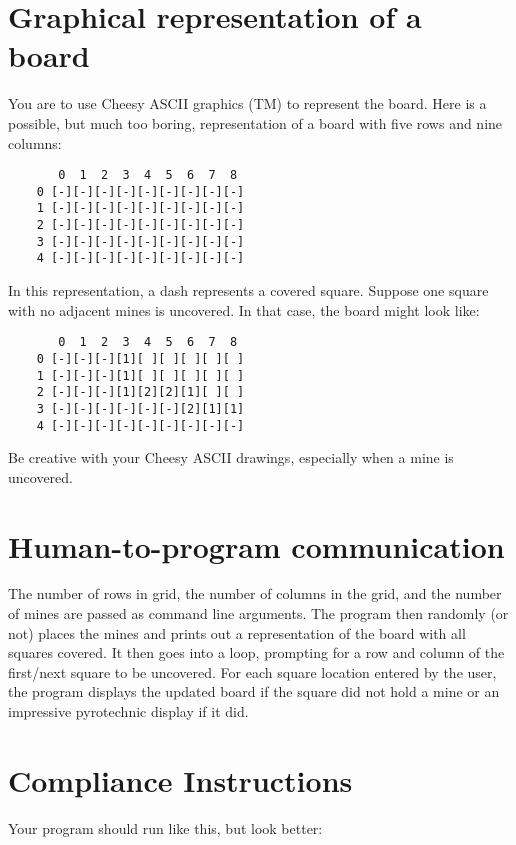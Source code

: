 \documentclass{article}
\begin{document}
\section*{Graphical representation of a board}

You are to use Cheesy ASCII graphics (TM) to represent the board. Here
is a possible, but much too boring, representation of a board with five
rows and nine columns:

\begin{verbatim}
       0  1  2  3  4  5  6  7  8
    0 [-][-][-][-][-][-][-][-][-]
    1 [-][-][-][-][-][-][-][-][-]
    2 [-][-][-][-][-][-][-][-][-]
    3 [-][-][-][-][-][-][-][-][-]
    4 [-][-][-][-][-][-][-][-][-]
\end{verbatim}

In this representation, a  dash represents a covered square.  Suppose one
square with no adjacent mines is uncovered. In that case, the board
might look like:

\begin{verbatim}
       0  1  2  3  4  5  6  7  8
    0 [-][-][-][1][ ][ ][ ][ ][ ]
    1 [-][-][-][1][ ][ ][ ][ ][ ]
    2 [-][-][-][1][2][2][1][ ][ ]
    3 [-][-][-][-][-][-][2][1][1]
    4 [-][-][-][-][-][-][-][-][-]
\end{verbatim}

Be creative with your Cheesy ASCII drawings, especially when a mine
is uncovered.

\section*{Human-to-program communication}

The number of rows in grid, the number of columns in the grid, and the
number of mines are passed as command line arguments. The program then
randomly (or not) places the mines and prints out a representation of
the board with all squares covered.  It then goes into a loop, prompting
for a row and column of the first/next square to be uncovered. For each
square location entered by the user, the program displays the updated
board if the square did not hold a mine or an impressive pyrotechnic
display if it did.

\section*{Compliance Instructions}

Your program should run like this, but look better:
\end{document}

